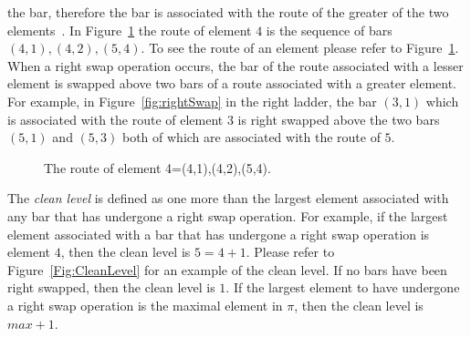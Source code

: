 the bar, therefore the bar is associated with the route of the greater of the two elements~\cite{A1}. 
In Figure~\ref{Fig:Route} the route of element $4$ is the sequence of bars 
$(4,1),(4,2),(5,4)$. To see the route of an element please refer to Figure~\ref{Fig:Route}. When a 
right swap operation occurs, the bar of the route associated with a lesser element is 
swapped above two bars of a route associated with a greater element. For example, in Figure~\ref{fig:rightSwap} in the right ladder, 
the bar $(3,1)$ which is associated with the route of element $3$ is right swapped above the two bars $(5,1)$ and $(5,3)$ 
both of which are associated with the route of $5$.\par 
\begin{figure}[h]
	\centering
	\caption{The route of element 4=(4,1),(4,2),(5,4).}
	\label{Fig:Route}
\end{figure}



The \emph{clean level} is defined as one more than the largest 
element associated with any bar that has undergone a right swap operation. 
For example, if the largest element associated with a bar that has undergone a 
right swap operation is element $4$, then the clean level is $5=4+1$.
 Please refer to Figure~\ref{Fig:CleanLevel} for an example of the clean level.
 If no bars have been right swapped, then the clean level is $1$.
If the largest element to have undergone a right swap operation is the maximal element in $\pi$, 
then the clean level is $max+1$.\pagebreak

